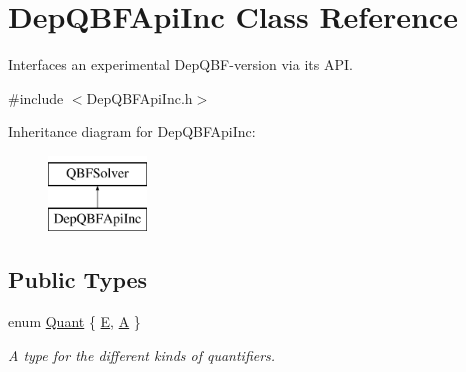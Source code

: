 \hypertarget{classDepQBFApiInc}{\section{Dep\-Q\-B\-F\-Api\-Inc Class Reference}
\label{classDepQBFApiInc}
}


Interfaces an experimental Dep\-Q\-B\-F-\/version via its A\-P\-I.  




{\ttfamily \#include $<$Dep\-Q\-B\-F\-Api\-Inc.\-h$>$}

Inheritance diagram for Dep\-Q\-B\-F\-Api\-Inc\-:\begin{figure}[H]
\begin{center}
\leavevmode
\includegraphics[height=2.000000cm]{classDepQBFApiInc}
\end{center}
\end{figure}
\subsection*{Public Types}
\begin{DoxyCompactItemize}
\item 
enum \hyperlink{classQBFSolver_ac091e263cb55286cc07b2451bcf4d3c7}{Quant} \{ \hyperlink{classQBFSolver_ac091e263cb55286cc07b2451bcf4d3c7a090ab4a5b262710ccd80e97d72f9a7b3}{E}, 
\hyperlink{classQBFSolver_ac091e263cb55286cc07b2451bcf4d3c7afd6518d5d985aa8346ac071e4c0d8ee0}{A}
 \}
\begin{DoxyCompactList}\small\item\em A type for the different kinds of quantifiers. \end{DoxyCompactList}\end{DoxyCompactItemize}
